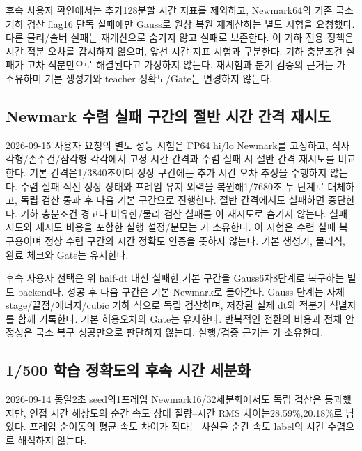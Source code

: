 \documentclass[10pt]{article}
\begin{document}
후속 사용자 확인에서는 추가128분할 시간 지표를 제외하고, Newmark64의 기존
국소 기하 검산 flag16 단독 실패에만 Gauss로 원상 복원 재계산하는 별도 시험을 요청했다.
다른 물리/솔버 실패는 재계산으로 숨기지 않고 실패로 보존한다.
이 기하 전용 정책은 시간 적분 오차를 감시하지 않으며, 앞선 시간 지표 시험과 구분한다.
기하 충분조건 실패가 고차 적분만으로 해결된다고 가정하지 않는다.
재시험과 분기 검증의 근거는 가 소유하며
기본 생성기와 teacher 정확도/Gate는 변경하지 않는다.

\subsection{Newmark 수렴 실패 구간의 절반 시간 간격 재시도}
2026-09-15 사용자 요청의 별도 성능 시험은 FP64 hi/lo Newmark를 고정하고,
직사각형/손수건/삼각형 각각에서 고정 시간 간격과 수렴 실패 시 절반 간격 재시도를 비교한다.
기본 간격은1/3840초이며 정상 구간에는 추가 시간 오차 추정을 수행하지 않는다.
수렴 실패 직전 정상 상태와 프레임 유지 외력을 복원해1/7680초 두 단계로 대체하고,
독립 검산 통과 후 다음 기본 구간으로 진행한다. 절반 간격에서도 실패하면 중단한다.
기하 충분조건 경고나 비유한/물리 검산 실패를 이 재시도로 숨기지 않는다.
실패 시도와 재시도 비용을 포함한 실행 설정/분모는
가 소유한다.
이 시험은 수렴 실패 복구용이며 정상 수렴 구간의 시간 정확도 인증을 뜻하지 않는다.
기본 생성기, 물리식, 완료 체크와 Gate는 유지한다.

후속 사용자 선택은 위 half-dt 대신 실패한 기본 구간을 Gauss6차8단계로 복구하는
별도  backend다. 성공 후 다음 구간은 기본 Newmark로 돌아간다.
Gauss 단계는 자체 stage/끝점/에너지/cubic 기하 식으로 독립 검산하며,
저장된 실제 dt와 적분기 식별자를 함께 기록한다. 기본 허용오차와 Gate는 유지한다.
반복적인 전환의 비용과 전체 안정성은 국소 복구 성공만으로 판단하지 않는다.
실행/검증 근거는 가 소유한다.

\subsection{1/500 학습 정확도의 후속 시간 세분화}
2026-09-14 동일2초 seed의1프레임 Newmark16/32세분화에서도 독립 검산은 통과했지만,
인접 시간 해상도의 순간 속도 상대 질량--시간 RMS 차이는28.59\%,20.18\%로 남았다.
프레임 순이동의 평균 속도 차이가 작다는 사실을 순간 속도 label의 시간 수렴으로 해석하지 않는다.
\end{document}
